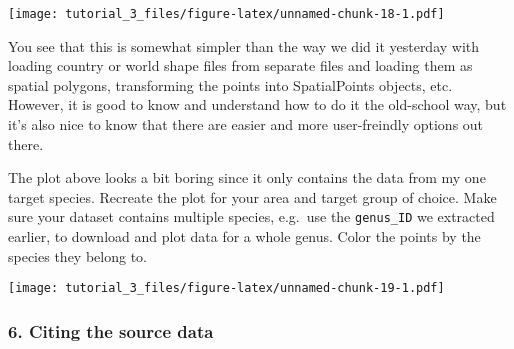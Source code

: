 \documentclass[]{article}
\newenvironment{Shaded}{\begin{snugshade}}{\end{snugshade}}
\newcommand{\CommentTok}[1]{\textcolor[rgb]{0.56,0.35,0.01}{\textit{#1}}}
\newcommand{\DataTypeTok}[1]{\textcolor[rgb]{0.13,0.29,0.53}{#1}}
\newcommand{\DecValTok}[1]{\textcolor[rgb]{0.00,0.00,0.81}{#1}}
\newcommand{\FloatTok}[1]{\textcolor[rgb]{0.00,0.00,0.81}{#1}}
\newcommand{\KeywordTok}[1]{\textcolor[rgb]{0.13,0.29,0.53}{\textbf{#1}}}
\newcommand{\NormalTok}[1]{#1}
\newcommand{\OperatorTok}[1]{\textcolor[rgb]{0.81,0.36,0.00}{\textbf{#1}}}
\newcommand{\StringTok}[1]{\textcolor[rgb]{0.31,0.60,0.02}{#1}}
\begin{document}
\begin{Shaded}
\end{Shaded}

\texttt{[image: tutorial\_3\_files/figure-latex/unnamed-chunk-18-1.pdf]}

You see that this is somewhat simpler than the way we did it yesterday
with loading country or world shape files from separate files and
loading them as spatial polygons, transforming the points into
SpatialPoints objects, etc. However, it is good to know and understand
how to do it the old-school way, but it's also nice to know that there
are easier and more user-freindly options out there.

The plot above looks a bit boring since it only contains the data from
my one target species. Recreate the plot for your area and target group
of choice. Make sure your dataset contains multiple species, e.g.~use
the \texttt{genus\_ID} we extracted earlier, to download and plot data
for a whole genus. Color the points by the species they belong to.

\texttt{[image: tutorial\_3\_files/figure-latex/unnamed-chunk-19-1.pdf]}

\hypertarget{citing-the-source-data}{%
\subsubsection{6. Citing the source data}\label{citing-the-source-data}}
\end{document}
